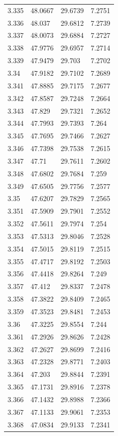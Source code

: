 \begin{tabular}{llll}
3.335 & 48.0667 & 29.6739 & 7.2751 \\
3.336 & 48.037 & 29.6812 & 7.2739 \\
3.337 & 48.0073 & 29.6884 & 7.2727 \\
3.338 & 47.9776 & 29.6957 & 7.2714 \\
3.339 & 47.9479 & 29.703 & 7.2702 \\
3.34 & 47.9182 & 29.7102 & 7.2689 \\
3.341 & 47.8885 & 29.7175 & 7.2677 \\
3.342 & 47.8587 & 29.7248 & 7.2664 \\
3.343 & 47.829 & 29.7321 & 7.2652 \\
3.344 & 47.7993 & 29.7393 & 7.264 \\
3.345 & 47.7695 & 29.7466 & 7.2627 \\
3.346 & 47.7398 & 29.7538 & 7.2615 \\
3.347 & 47.71 & 29.7611 & 7.2602 \\
3.348 & 47.6802 & 29.7684 & 7.259 \\
3.349 & 47.6505 & 29.7756 & 7.2577 \\
3.35 & 47.6207 & 29.7829 & 7.2565 \\
3.351 & 47.5909 & 29.7901 & 7.2552 \\
3.352 & 47.5611 & 29.7974 & 7.254 \\
3.353 & 47.5313 & 29.8046 & 7.2528 \\
3.354 & 47.5015 & 29.8119 & 7.2515 \\
3.355 & 47.4717 & 29.8192 & 7.2503 \\
3.356 & 47.4418 & 29.8264 & 7.249 \\
3.357 & 47.412 & 29.8337 & 7.2478 \\
3.358 & 47.3822 & 29.8409 & 7.2465 \\
3.359 & 47.3523 & 29.8481 & 7.2453 \\
3.36 & 47.3225 & 29.8554 & 7.244 \\
3.361 & 47.2926 & 29.8626 & 7.2428 \\
3.362 & 47.2627 & 29.8699 & 7.2416 \\
3.363 & 47.2328 & 29.8771 & 7.2403 \\
3.364 & 47.203 & 29.8844 & 7.2391 \\
3.365 & 47.1731 & 29.8916 & 7.2378 \\
3.366 & 47.1432 & 29.8988 & 7.2366 \\
3.367 & 47.1133 & 29.9061 & 7.2353 \\
3.368 & 47.0834 & 29.9133 & 7.2341 \\

\end{tabular}
